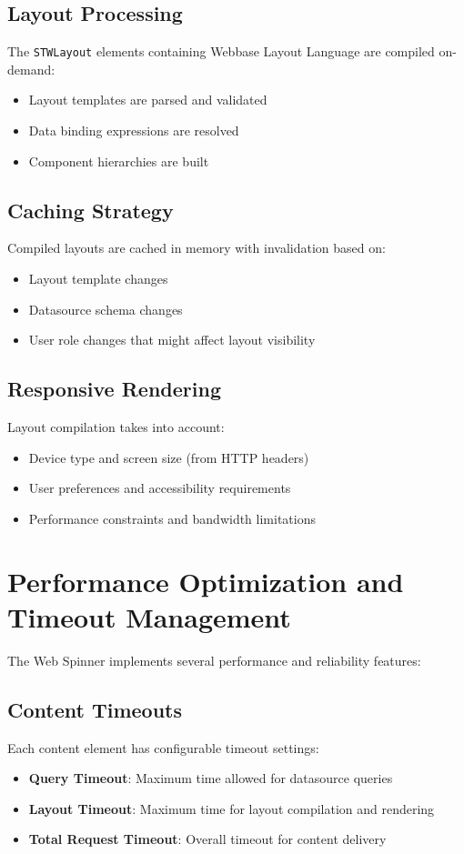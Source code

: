 \subsection{Layout Processing}
The \texttt{STWLayout} elements containing Webbase Layout Language are compiled on-demand:
\begin{itemize}
\item Layout templates are parsed and validated
\item Data binding expressions are resolved
\item Component hierarchies are built
\end{itemize}

\subsection{Caching Strategy}
Compiled layouts are cached in memory with invalidation based on:
\begin{itemize}
\item Layout template changes
\item Datasource schema changes
\item User role changes that might affect layout visibility
\end{itemize}

\subsection{Responsive Rendering}
Layout compilation takes into account:
\begin{itemize}
\item Device type and screen size (from HTTP headers)
\item User preferences and accessibility requirements
\item Performance constraints and bandwidth limitations
\end{itemize}

\section{Performance Optimization and Timeout Management}

The Web Spinner implements several performance and reliability features:

\subsection{Content Timeouts}
Each content element has configurable timeout settings:
\begin{itemize}
\item \textbf{Query Timeout}: Maximum time allowed for datasource queries
\item \textbf{Layout Timeout}: Maximum time for layout compilation and rendering
\item \textbf{Total Request Timeout}: Overall timeout for content delivery
\end{itemize}

